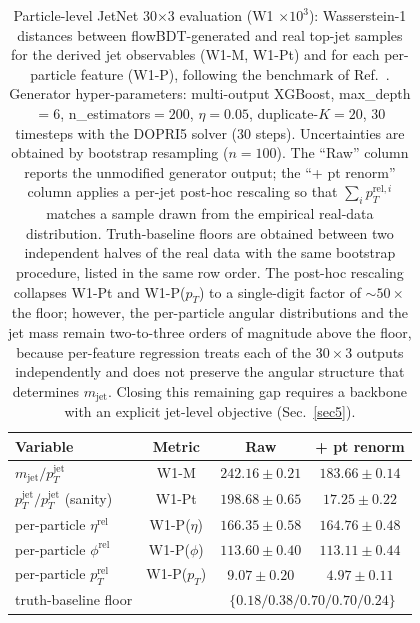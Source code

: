\documentclass[%
 reprint,
 amsmath,amssymb,
 aps,
prd,
floatfix,
]{revtex4-2}
\begin{document}
\begin{table}[htbp]
\begin{ruledtabular}
        \begin{tabular}{lccc}
        \textbf{Variable} & \textbf{Metric} & \textbf{Raw} & \textbf{+ pt renorm} \\
        \hline
        $m_\mathrm{jet}/p_T^\mathrm{jet}$            & W1-M  & $242.16 \pm 0.21$ & $183.66 \pm 0.14$ \\
        $p_T^\mathrm{jet}/p_T^\mathrm{jet}$ (sanity) & W1-Pt & $198.68 \pm 0.65$ & $17.25 \pm 0.22$ \\
        per-particle $\eta^\mathrm{rel}$             & W1-P($\eta$)   & $166.35 \pm 0.58$ & $164.76 \pm 0.48$ \\
        per-particle $\phi^\mathrm{rel}$             & W1-P($\phi$)   & $113.60 \pm 0.40$ & $113.11 \pm 0.44$ \\
        per-particle $p_T^\mathrm{rel}$              & W1-P($p_T$)    & $9.07 \pm 0.20$ & $4.97 \pm 0.11$ \\
        \hline
        truth-baseline floor                         &       & \multicolumn{2}{c}{$\{0.18 / 0.38 / 0.70 / 0.70 / 0.24\}$} \\
        \end{tabular}
     \caption{Particle-level JetNet 30$\times$3 evaluation (W1 $\times 10^3$): Wasserstein-1 distances between flowBDT-generated and real top-jet samples for the derived jet observables (W1-M, W1-Pt) and for each per-particle feature (W1-P), following the benchmark of Ref.~\cite{Kansal}. Generator hyper-parameters: multi-output XGBoost, max\_depth$=6$, n\_estimators$=200$, $\eta=0.05$, duplicate-$K=20$, 30 timesteps with the DOPRI5 solver (30 steps). Uncertainties are obtained by bootstrap resampling ($n=100$). The ``Raw'' column reports the unmodified generator output; the ``+ pt renorm'' column applies a per-jet post-hoc rescaling so that $\sum_i p_T^{\mathrm{rel},i}$ matches a sample drawn from the empirical real-data distribution. Truth-baseline floors are obtained between two independent halves of the real data with the same bootstrap procedure, listed in the same row order. The post-hoc rescaling collapses W1-Pt and W1-P($p_T$) to a single-digit factor of $\sim\!50\times$ the floor; however, the per-particle angular distributions and the jet mass remain two-to-three orders of magnitude above the floor, because per-feature regression treats each of the $30\times3$ outputs independently and does not preserve the angular structure that determines $m_\mathrm{jet}$. Closing this remaining gap requires a backbone with an explicit jet-level objective (Sec.~\ref{sec5}).}
     \label{tab2}
\end{ruledtabular}
\end{table}
\end{document}
